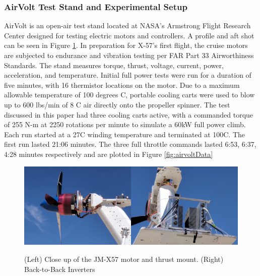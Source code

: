 \documentclass[]{aiaa-tc}%
\begin{document}
\subsubsection{AirVolt Test Stand and Experimental Setup}

AirVolt is an open-air test stand located at NASA's Armstrong Flight Research Center designed for testing electric motors and controllers.\cite{Aamod_2015} \cite{Papathakis}A profile and aft shot can be seen in Figure \ref{fig:airvolt2}. In preparation for X-57's first flight, the cruise motors are subjected to endurance and vibration testing per FAR Part 33 Airworthiness Standards. The stand measures torque, thrust, voltage, current, power, acceleration, and temperature. Initial full power tests were run for a duration of five minutes, with 16 thermistor locations on the motor. Due to a maximum allowable temperature of 100 degrees C, portable cooling carts were used to blow up to 600 lbs/min of 8 \degree C air directly onto the propeller spinner.  The test discussed in this paper had three cooling carts active, with a commanded torque of 255 N-m at 2250 rotations per minute to simulate a 60kW full power climb. Each run started at a 27\degree C winding temperature and terminated at 100\degree C. The first run lasted 21:06 minutes. The three full throttle commands lasted 6:53, 6:37, 4:28 minutes respectively and are plotted in Figure \ref{fig:airvoltData}

\begin{figure}[!htb]%
	\centering
	\includegraphics[width=0.5\textwidth]{figures/AirVoltSide.jpg}\includegraphics[width=0.5\textwidth]{figures/AirVolt_Back.jpg}
	\caption{(Left) Close up of the JM-X57 motor and thrust mount. (Right) Back-to-Back Inverters}
	\label{fig:airvolt2}
\end{figure}
\end{document}
